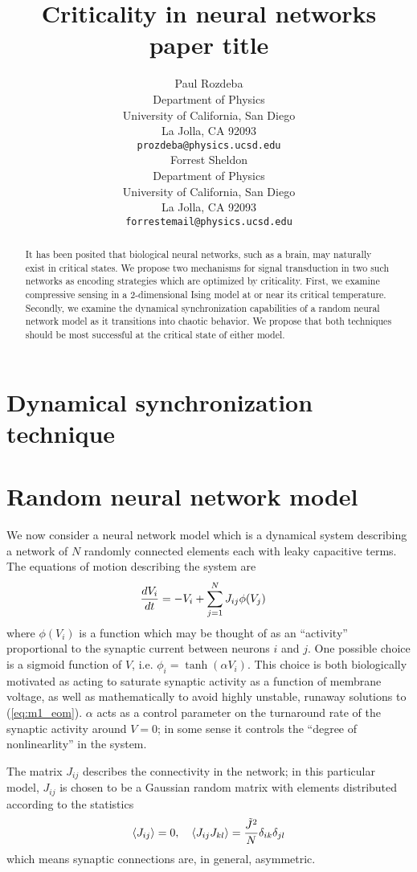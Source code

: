 \documentclass{article} %
\title{Criticality in neural networks paper title}
\author{
Paul Rozdeba%
\\
Department of Physics\\
University of California, San Diego\\
La Jolla, CA 92093 \\
\texttt{prozdeba@physics.ucsd.edu} \\
\And
Forrest Sheldon \\
Department of Physics\\
University of California, San Diego\\
La Jolla, CA 92093 \\
\texttt{forrestemail@physics.ucsd.edu} \\
}
\begin{document}
\maketitle

\begin{abstract}
It has been posited that biological neural networks, such as a brain, may naturally exist in critical states.  We propose two mechanisms for signal transduction in two such networks as encoding strategies which are optimized by criticality.  First, we examine compressive sensing in a 2-dimensional Ising model at or near its critical temperature.  Secondly, we examine the dynamical synchronization capabilities of a random neural network model as it transitions into chaotic behavior.  We propose that both techniques should be most successful at the critical state of either model.
\end{abstract}

\section{Dynamical synchronization technique}

\section{Random neural network model}
We now consider a neural network model which is a dynamical system describing a network of $N$ randomly connected elements each with leaky capacitive terms.  The equations of motion describing the system are
\begin{align}
	\frac{d V_i}{d t} &= -V_i + \sum_{j=1}^{N} J_{ij} \phi(V_j) \label{eq:m1_eom}
\end{align}
where $\phi(V_i)$ is a function which may be thought of as an ``activity'' proportional to the synaptic current between neurons $i$ and $j$.  One possible choice is a sigmoid function of $V$, i.e. $\phi_i = \tanh\left(\alpha V_i\right)$.  This choice is both biologically motivated as acting to saturate synaptic activity as a function of membrane voltage, as well as mathematically to avoid highly unstable, runaway solutions to (\ref{eq:m1_eom}).  $\alpha$ acts as a control parameter on the turnaround rate of the synaptic activity around $V = 0$; in some sense it controls the ``degree of nonlinearlity'' in the system.

The matrix $J_{ij}$ describes the connectivity in the network; in this particular model, $J_{ij}$ is chosen to be a Gaussian random matrix with elements distributed according to the statistics
\begin{align*}
	\left\langle J_{ij} \right\rangle = 0, \quad \left\langle J_{ij}J_{kl} \right\rangle = \frac{\tilde{J}^2}{N} \delta_{ik}\delta_{jl}
\end{align*}
which means synaptic connections are, in general, asymmetric.
\end{document}
